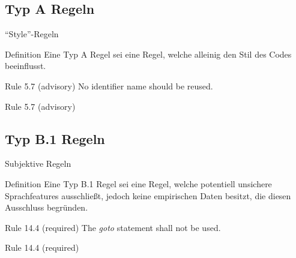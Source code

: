 \documentclass{beamer}
\begin{document}
    \subsection{Typ A Regeln}
    \label{subsec:typ-a-regeln}
    \begin{frame}{\enquote{Style}-Regeln}
         {
            \begin{block}{Definition}
                Eine Typ A Regel sei eine Regel, welche alleinig den Stil des Codes beeinflusst.
            \end{block}
            \pause
            \begin{exampleblock}{Rule 5.7 (advisory)}
                No identifier name should be reused.
            \end{exampleblock}
        }
         {
            \begin{exampleblock}{Rule 5.7 (advisory)}
                
            \end{exampleblock}
        }
    \end{frame}

    \subsection{Typ B.1 Regeln}
    \label{subsec:typ-b-1-regeln}
    \begin{frame}{Subjektive Regeln}
         {
            \begin{block}{Definition}
                Eine Typ B.1 Regel sei eine Regel, welche potentiell unsichere Sprachfeatures ausschließt,
                jedoch keine empirischen Daten besitzt, die diesen Ausschluss begründen.
            \end{block}
            \pause
            \begin{exampleblock}{Rule 14.4 (required)}
                The \textit{goto} statement shall not be used.
            \end{exampleblock}
        }
         {
            \begin{exampleblock}{Rule 14.4 (required)}
                
            \end{exampleblock}
        }
    \end{frame}
\end{document}
